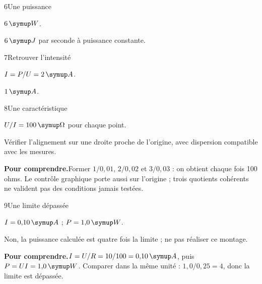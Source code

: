 \par\noindent\begin{minipage}{\linewidth}
\begin{corrige}{6}{Une puissance}
\begin{questions}
\item $6\unite W$.
\item $6\unite J$ par seconde à puissance constante.
\end{questions}
\end{corrige}
\end{minipage}
\par\noindent\begin{minipage}{\linewidth}
\begin{corrige}{7}{Retrouver l’intensité}
\begin{questions}
\item $I=P/U=2\unite A$.
\item $1\unite A$.
\end{questions}
\end{corrige}
\end{minipage}
\par\noindent\begin{minipage}{\linewidth}
\begin{corrige}{8}{Une caractéristique}
\begin{questions}
\item $U/I=100\unite\Omega$ pour chaque point.
\item Vérifier l’alignement sur une droite proche de l’origine, avec dispersion compatible avec les mesures.
\end{questions}
\par\smallskip\noindent\textbf{Pour comprendre.}\enspace Former $1/0{,}01$, $2/0{,}02$ et $3/0{,}03$ : on obtient chaque fois 100 ohms. Le contrôle graphique porte aussi sur l’origine ; trois quotients cohérents ne valident pas des conditions jamais testées.\par
{}
\end{corrige}
\end{minipage}
\par\noindent\begin{minipage}{\linewidth}
\begin{corrige}{9}{Une limite dépassée}
\begin{questions}
\item $I=0{,}10\unite A$ ; $P=1{,}0\unite W$.
\item Non, la puissance calculée est quatre fois la limite ; ne pas réaliser ce montage.
\end{questions}
\par\smallskip\noindent\textbf{Pour comprendre.}\enspace $I=U/R=10/100=0{,}10\unite A$, puis $P=UI=1{,}0\unite W$. Comparer dans la même unité : $1{,}0/0{,}25=4$, donc la limite est dépassée.\par
\end{corrige}
\end{minipage}
